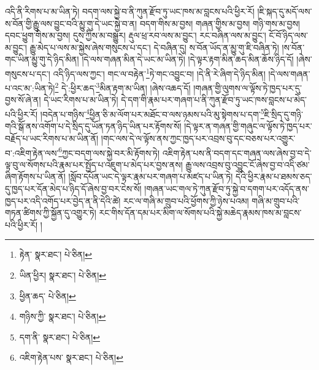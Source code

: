 འདི་ནི་རིགས་པ་མ་ཡིན་ཏེ། བདག་ལས་སྐྱེ་བ་ནི་ཀུན་རྫོབ་ཏུ་ཡང་ཁས་མ་བླངས་པའི་ཕྱིར་རོ། །ཇི་སྐད་དུ་མདོ་ལས་ས་བོན་གྱི་རྒྱུ་ལས་བྱུང་བའི་མྱུ་གུ་དེ་ཡང་སྐྱེ་བ་ན། བདག་གིས་མ་བྱས། གཞན་གྱིས་མ་བྱས། གཉི་གས་མ་བྱས། དབང་ཕྱུག་གིས་མ་བྱས། དུས་ཀྱིས་མ་བསྒྱུར། རྡུལ་ཕྲ་རབ་ལས་མ་བྱུང་། རང་བཞིན་ལས་མ་བྱུང་། ངོ་བོ་ཉིད་ལས་མ་བྱུང་། རྒྱུ་མེད་པ་ལས་མ་སྐྱེས་ཞེས་གསུངས་པ་དང་། དེ་བཞིན་དུ། ས་བོན་ཡོད་ན་མྱུ་གུ་ཇི་བཞིན་ཏེ། །ས་བོན་གང་ཡིན་མྱུ་གུ་དེ་ཉིད་མིན། །དེ་ལས་གཞན་མིན་དེ་ཡང་མ་ཡིན་ཏེ། །དེ་ལྟར་རྟག་མིན་ཆད་མིན་ཆོས་ཉིད་དོ། །ཞེས་གསུངས་པ་དང་། འདི་ཉིད་ལས་ཀྱང་། གང་ལ་བརྟེན་\footnote{རྟེན་  སྣར་ཐང་།  པེ་ཅིན། }ཏེ་གང་འབྱུང་བ། །དེ་ནི་རེ་ཞིག་དེ་ཉིད་མིན། །དེ་ལས་གཞན་པ་འང་མ་:ཡིན་ཏེ།\footnote{ཡིན་ཕྱིར།  སྣར་ཐང་།  པེ་ཅིན། } དེ་:ཕྱིར་ཆད་\footnote{ཕྱིན་ཆད་  པེ་ཅིན། }མིན་རྟག་མ་ཡིན། །ཞེས་འཆད་དོ། །གཞན་གྱི་ལུགས་ལ་ལྟོས་ཏེ་ཁྱད་པར་དུ་བྱས་སོ་ཞེ་ན། དེ་ཡང་རིགས་པ་མ་ཡིན་ཏེ། དེ་དག་གི་རྣམ་པར་གཞག་པ་ནི་ཀུན་རྫོབ་ཏུ་ཡང་ཁས་བླངས་པ་མེད་པའི་ཕྱིར་རོ། །བདེན་པ་གཉིས་\footnote{གཉིས་ཀྱི་  སྣར་ཐང་།  པེ་ཅིན། }ཕྱིན་ཅི་མ་ལོག་པར་མཐོང་བ་ལས་ཉམས་པའི་མུ་སྟེགས་པ་དག་\footnote{དག་ནི་  སྣར་ཐང་།  པེ་ཅིན། }ཇི་སྲིད་དུ་གཉི་གའི་སྒོ་ནས་འགོག་པ་དེ་སྲིད་དུ་ཡོན་ཏན་ཉིད་ཡིན་པར་རྟོགས་སོ། །དེ་ལྟར་ན་གཞན་གྱི་གཞུང་ལ་ལྟོས་ཏེ་ཁྱད་པར་བརྗོད་པ་ཡང་རིགས་པ་མ་ཡིན་ནོ། །གང་ལས་དེ་ལ་ལྟོས་ནས་ཀྱང་ཁྱད་པར་འབྲས་བུ་དང་བཅས་པར་འགྱུར་བ་:འཇིག་རྟེན་ལས་\footnote{འཇིག་རྟེན་པས་  སྣར་ཐང་།  པེ་ཅིན། }ཀྱང་བདག་ལས་སྐྱེ་བར་མི་རྟོགས་ཏེ། འཇིག་རྟེན་པས་ནི་བདག་དང་གཞན་ལས་ཞེས་བྱ་བ་དེ་ལྟ་བུ་ལ་སོགས་པའི་རྣམ་པར་སྤྱོད་པ་འཇུག་པ་མེད་པར་བྱས་ནས། རྒྱུ་ལས་འབྲས་བུ་འབྱུང་ངོ་ཞེས་བྱ་བ་འདི་ཙམ་ཞིག་རྟོགས་པ་ཡིན་ནོ། །སློབ་དཔོན་ཡང་དེ་ལྟར་རྣམ་པར་གཞག་པ་མཛད་པ་ཡིན་ཏེ། དེའི་ཕྱིར་རྣམ་པ་ཐམས་ཅད་དུ་ཁྱད་པར་དོན་མེད་པ་ཉིད་དོ་ཞེས་བྱ་བར་ངེས་སོ། །གཞན་ཡང་གལ་ཏེ་ཀུན་རྫོབ་ཏུ་སྐྱེ་བ་དགག་པར་འདོད་ནས་ཁྱད་པར་འདི་འགོད་པར་བྱེད་ན་ནི་དེའི་ཚེ། རང་ལ་གཞི་མ་གྲུབ་པའི་ཕྱོགས་ཀྱི་ཉེས་པའམ། གཞི་མ་གྲུབ་པའི་གཏན་ཚིགས་ཀྱི་སྐྱོན་དུ་འགྱུར་ཏེ། རང་གིས་དོན་དམ་པར་མིག་ལ་སོགས་པའི་སྐྱེ་མཆེད་རྣམས་ཁས་མ་བླངས་པའི་ཕྱིར་རོ། །
